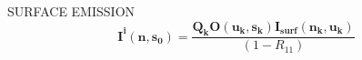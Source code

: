 \begin{minipage}{7cm}
\begin{sf}
SURFACE EMISSION
\[
\mathbf{I^i(n,s_0)}=\frac{\mathbf{Q_k}\mathbf{O(u_k,s_k)I_{surf}(n_k,u_k)}}{\left(1-R_{11}\right)}
\]
\end{sf}
\end{minipage}
